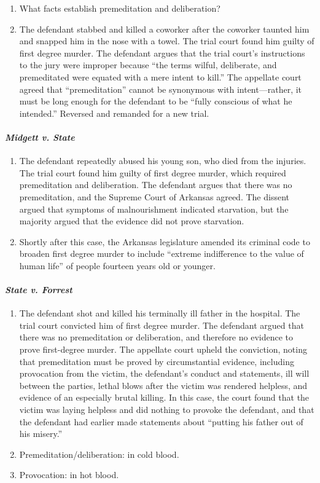 \begin{enumerate}
    \item What facts establish premeditation and deliberation?
    \item The defendant stabbed and killed a coworker after the coworker taunted him and snapped him in the nose with a towel. The trial court found him guilty of first degree murder. The defendant argues that the trial court's instructions to the jury were improper because ``the terms wilful, deliberate, and premeditated were equated with a mere intent to kill.'' The appellate court agreed that ``premeditation'' cannot be synonymous with intent---rather, it must be long enough for the defendant to be ``fully conscious of what he intended.'' Reversed and remanded for a new trial.
\end{enumerate}

\paragraph{\emph{Midgett v. State}}

\begin{enumerate}
    \item The defendant repeatedly abused his young son, who died from the injuries. The trial court found him guilty of first degree murder, which required premeditation and deliberation. The defendant argues that there was no premeditation, and the Supreme Court of Arkansas agreed. The dissent argued that symptoms of malnourishment indicated starvation, but the majority argued that the evidence did not prove starvation.
    \item Shortly after this case, the Arkansas legislature amended its criminal code to broaden first degree murder to include ``extreme indifference to the value of human life'' of people fourteen years old or younger.
\end{enumerate}

\paragraph{\emph{State v. Forrest}}

\begin{enumerate}
    \item The defendant shot and killed his terminally ill father in the hospital. The trial court convicted him of first degree murder. The defendant argued that there was no premeditation or deliberation, and therefore no evidence to prove first-degree murder. The appellate court upheld the conviction, noting that premeditation must be proved by circumstantial evidence, including provocation from the victim, the defendant's conduct and statements, ill will between the parties, lethal blows after the victim was rendered helpless, and evidence of an especially brutal killing. In this case, the court found that the victim was laying helpless and did nothing to provoke the defendant, and that the defendant had earlier made statements about ``putting his father out of his misery.''
    \item Premeditation/deliberation: in cold blood.
    \item Provocation: in hot blood.
\end{enumerate}

